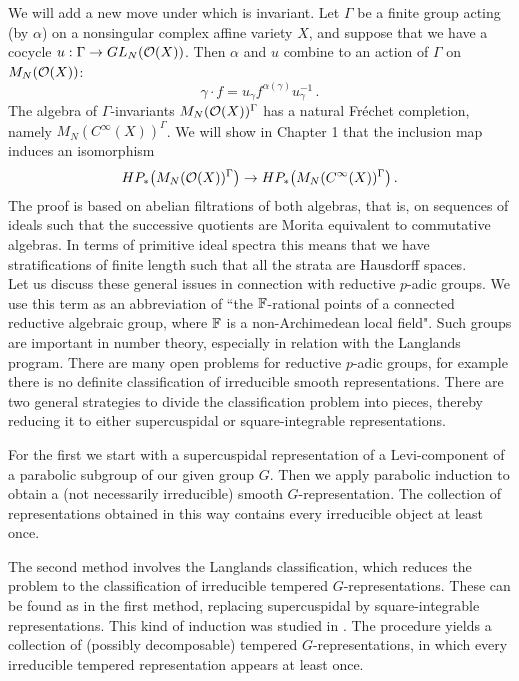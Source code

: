 We will add a new move under which \pch is invariant. Let $\Gamma$ be a finite 
group acting (by $\alpha$) on a nonsingular 
complex affine variety $X$, and suppose that we have a cocycle 
$u: \Gamma \to GL_N (\mathcal O (X))$. Then $\alpha$ and $u$ combine to 
an action of $\Gamma$ on $M_N (\mathcal O (X))$:
\begin{equation}
\gamma \cdot f = u_\gamma f^{\alpha (\gamma)} u^{-1}_\gamma \,.
\end{equation}
The algebra of $\Gamma$-invariants $M_N (\mathcal O (X) )^\Gamma$ has a natural 
Fr\'echet completion, namely $M_N (C^\infty (X) )^\Gamma$. We will show in
Chapter 1 that the inclusion map induces an isomorphism
\begin{equation}\label{eq:0.1}
HP_* \big( M_N (\mathcal O (X) )^\Gamma \big) \to 
HP_* \big( M_N (C^\infty (X) )^\Gamma \big) \,.
\end{equation}
The proof is based on abelian filtrations of both algebras, that is, on sequences of ideals
such that the successive quotients are Morita equivalent to commutative algebras.
In terms of primitive ideal spectra this means that we have stratifications of finite length
such that all the strata are Hausdorff spaces.
\\[1mm]

Let us discuss these general issues in connection with reductive $p$-adic groups. 
We use this term as an abbreviation of ``the $\mathbb F$-rational points of a 
connected reductive algebraic group, where $\mathbb F$ is a non-Archimedean local 
field". Such groups are
important in number theory, especially in relation with the Langlands program.
There are many open problems for reductive $p$-adic groups, for example there is
no definite classification of irreducible smooth representations. There are two general 
strategies to divide the classification problem into pieces, thereby reducing it to 
either supercuspidal or square-integrable representations. 

For the first we start with a 
supercuspidal representation of a Levi-component of a parabolic subgroup of 
our given group $G$. Then we apply parabolic induction to obtain a (not necessarily 
irreducible) smooth $G$-representation. The collection of representations obtained
in this way contains every irreducible object at least once.

The second method involves the Langlands classification, which reduces the problem
to the classification of irreducible tempered $G$-representations. These can be found
as in the first method, replacing supercuspidal by square-integrable representations. 
This kind of induction was studied in \cite{ScZi}. The procedure yields a collection of 
(possibly decomposable) tempered $G$-representations,
in which every irreducible tempered representation appears at least once. 

